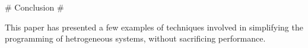 \begin{markdown}
# Conclusion #
\label{sec:conclusion}

This paper has presented a few examples of techniques involved in
simplifying the programming of hetrogeneous systems, without
sacrificing performance. 

\end{markdown}
